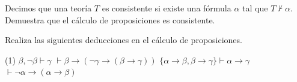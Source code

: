 \documentclass[fc]{tarea}
\begin{document}
\begin{exercise}
  Decimos que una teoría \(T\) es consistente si existe una fórmula \(\alpha\) tal que \(T\not \vdash \alpha\). Demuestra que el cálculo de proposiciones es consistente.
\end{exercise}


\begin{exercise}
  Realiza las siguientes deducciones en el cálculo de proposiciones.
  \begin{tasks}(1)
    \task $\beta, \neg \beta \vdash \gamma$ 
    \task $\vdash \beta \rightarrow (\neg \gamma \rightarrow (\beta \rightarrow \gamma))$ 
    \task $\{\alpha \rightarrow \beta, \beta \rightarrow \gamma\} \vdash \alpha \rightarrow \gamma$ 
    \task \(\vdash \neg \alpha \rightarrow (\alpha \rightarrow \beta)\)
  \end{tasks}
\end{exercise}
\end{document}
